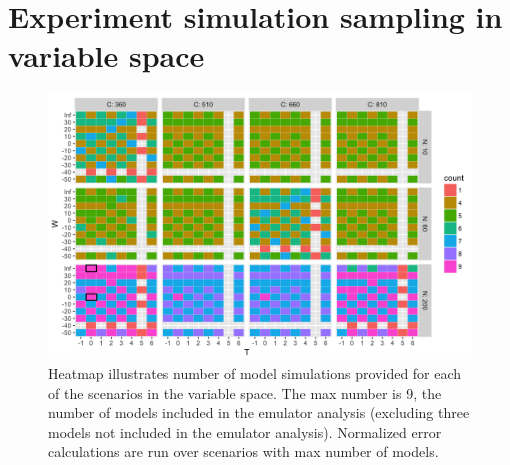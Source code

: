 \documentclass[10pt]{article}
\begin{document}
{{%
\clearpage

\renewcommand{\thefigure}{S\arabic{figure}}

\section{Experiment simulation sampling in variable space}
\begin{figure}[h!]
  \centering
  \includegraphics[width=\textwidth]{s_how_many_simulations.png}
  \caption{
  Heatmap illustrates number of model simulations provided for each of the scenarios in the variable space. 
  The max number is 9, the number of models included in the emulator analysis (excluding three models not included in the emulator analysis). 
  Normalized error calculations are run over scenarios with max number of models.
  }
  \label{fig:numbersims}
\end{figure}

\clearpage
}}
\end{document}
